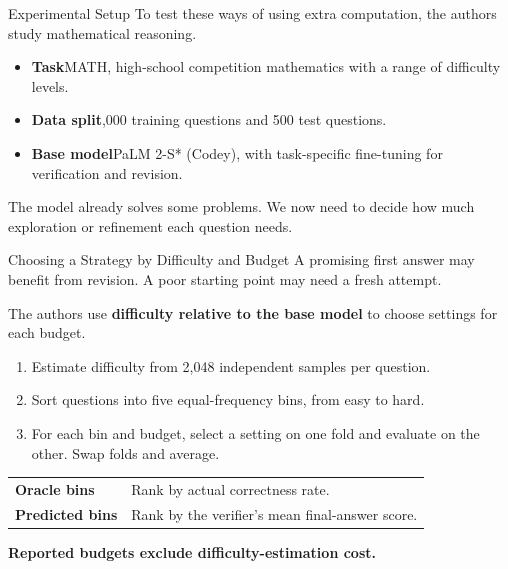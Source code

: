 \documentclass[aspectratio=1610,xcolor=dvipsnames,t]{beamer}
\newcommand{\keyterm}[1]{\textcolor{unirot}{\textbf{#1}}}
\begin{document}
\begin{frame}{Experimental Setup}
  To test these ways of using extra computation, the authors study mathematical reasoning.
  \par\smallskip
  \begin{itemize}
    \item \textbf{Task}\quad MATH, high-school competition mathematics with a range of difficulty levels.
    \item \textbf{Data split},000 training questions and 500 test questions.
    \item \textbf{Base model}\quad PaLM 2-S* (Codey), with task-specific fine-tuning for verification and revision.
  \end{itemize}
  \par\medskip
  The model already solves some problems. We now need to decide how much exploration or refinement each question needs.
\end{frame}

\begin{frame}{Choosing a Strategy by Difficulty and Budget}
  A promising first answer may benefit from revision. A poor starting point may need a fresh attempt.
  \par\smallskip
  The authors use \keyterm{difficulty relative to the base model} to choose settings for each budget.
  \par\medskip
  \begin{enumerate}
    \item Estimate difficulty from 2,048 independent samples per question.
    \item Sort questions into five equal-frequency bins, from easy to hard.
    \item For each bin and budget, select a setting on one fold and evaluate on the other. Swap folds and average.
  \end{enumerate}
  \par\smallskip
  \begin{tabular}{@{}ll@{}}
    \textbf{Oracle bins} & Rank by actual correctness rate.\\
    \textbf{Predicted bins} & Rank by the verifier's mean final-answer score.
  \end{tabular}
  \par\medskip
  \keyterm{Reported budgets exclude difficulty-estimation cost.}
\end{frame}
\end{document}
